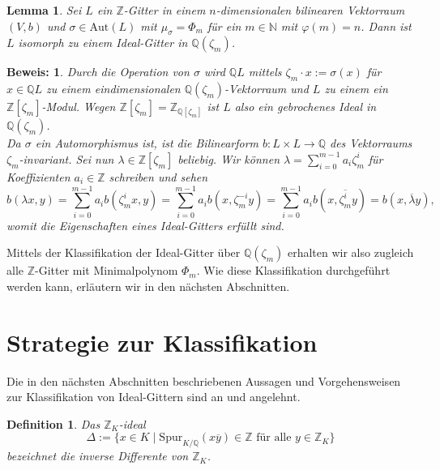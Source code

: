 \documentclass[12pt,a4paper,halfparskip,headsepline,bibtotocnumbered]{scrreprt}
\theoremstyle{nummermitklammern}
\newtheorem{definition}[defsatzusw]{Definition}
\newtheorem{lemma}[defsatzusw]{Lemma}
\theoremstyle{nonumberbreak}
\newtheorem{beweis}{Beweis:}
\newcommand{\N}{\mathbb{N}}
\newcommand{\Z}{\mathbb{Z}}
\newcommand{\Q}{\mathbb{Q}}
\newcommand{\Aut}{\text{Aut}}
\begin{document}
\begin{framed}
	\begin{lemma}\label{lem:ztoid}
		Sei $L$ ein $\Z$-Gitter in einem $n$-dimensionalen bilinearen Vektorraum $(V,b)$ und\linebreak
		$\sigma \in \Aut(L)$ mit $\mu_\sigma = \Phi_m$ für ein $m \in \N$ mit $\varphi(m) = n$. Dann ist $L$ isomorph zu einem Ideal-Gitter in $\Q \left( \zeta_m \right)$.
	\end{lemma}
\end{framed}

\begin{beweis}
	Durch die Operation von $\sigma$ wird $\Q L$ mittels $\zeta_m \cdot x := \sigma(x)$ für $x \in \Q L$ zu einem eindimensionalen $\Q \left( \zeta_m \right)$-Vektorraum und $L$ zu einem ein $\Z \left[ \zeta_m \right]$-Modul. Wegen\linebreak
	$\Z \left[ \zeta_m \right] = \Z_{\Q\left[\zeta_m \right]}$ ist $L$ also ein gebrochenes Ideal in $\Q \left( \zeta_m \right)$.\\
	Da $\sigma$ ein Automorphismus ist, ist die Bilinearform $b:L \times L \rightarrow \Q$ des Vektorraums $\zeta_m$-invariant. Sei nun $\lambda \in \Z \left[ \zeta_m \right]$ beliebig. Wir können $\lambda = \sum_{i=0}^{m-1} a_i \zeta_m^i $ für Koeffizienten $a_i \in \Z$ schreiben und sehen
	\begin{equation*}
		b(\lambda x, y) = \sum_{i=0}^{m-1} a_i b(\zeta_m^i x, y) = \sum_{i=0}^{m-1} a_i b(x, \zeta_m^{-i} y) = \sum_{i=0}^{m-1} a_i b(x, \overline{\zeta_m^i} y) = b(x, \overline{\lambda} y),
	\end{equation*}
	womit die Eigenschaften eines Ideal-Gitters erfüllt sind.
\end{beweis}

Mittels der Klassifikation der Ideal-Gitter über $\Q(\zeta_m)$ erhalten wir also zugleich alle  $\Z$-Gitter mit Minimalpolynom $\Phi_m$. Wie diese Klassifikation durchgeführt werden kann, erläutern wir in den nächsten Abschnitten.

\section{Strategie zur Klassifikation}

Die in den nächsten Abschnitten beschriebenen Aussagen und Vorgehensweisen zur Klassifikation von Ideal-Gittern sind an \cite[Abschnitt (3.2)]{juergens} und \cite[Abschnitt (5.2)]{nebe} angelehnt.

\begin{framed}
	\begin{definition}
		Das $\Z_K$-ideal
		\begin{equation*}
			\Delta := \lbrace x \in K \mid \text{Spur}_{K/\Q}(x \overline{y}) \in \Z \text{ für alle } y \in \Z_K \rbrace
		\end{equation*}
		bezeichnet die \textit{inverse Differente} von $\Z_K$.
	\end{definition}
\end{framed}
\end{document}
